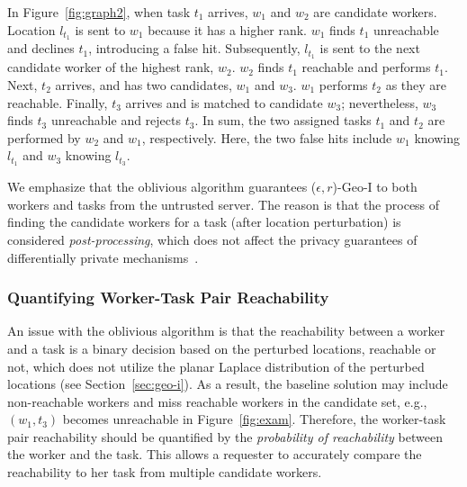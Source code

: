\documentclass{USC-Thesis}
\numberwithin{equation}{chapter}
\begin{document}
In Figure~\ref{fig:graph2}, when task $t_1$ arrives, $w_1$ and $w_2$ are candidate workers. Location $l_{t_1}$ is sent to $w_1$ because it has a higher rank. $w_1$ finds $t_1$ unreachable and declines $t_1$, introducing a false hit. Subsequently, $l_{t_1}$ is sent to the next candidate worker of the highest rank, $w_2$.  $w_2$ finds $t_1$ reachable and performs $t_1$. 
Next, $t_2$ arrives, and has two candidates, $w_1$ and $w_3$. $w_1$ performs $t_2$ as they are reachable. Finally, $t_3$ arrives and is matched to candidate $w_3$; nevertheless, $w_3$ finds $t_3$ unreachable and rejects $t_3$. In sum, the two assigned tasks $t_1$ and $t_2$ are performed by $w_2$ and $w_1$, respectively. Here, the two false hits include $w_1$ knowing $l_{t_1}$ and $w_3$ knowing $l_{t_3}$.

We emphasize that the oblivious algorithm guarantees ($\epsilon,r$)-Geo-I to both workers and tasks from the untrusted server. The reason is that the process of finding the candidate workers for a task (after location perturbation) is considered \emph{post-processing}, which does not affect the privacy guarantees of differentially private mechanisms~\cite{mcsherry2009privacy}.

\subsubsection{Quantifying Worker-Task Pair Reachability}
\label{sec:reachability}

An issue with the oblivious algorithm is that the reachability between a worker and a task is a binary decision based on the perturbed locations, reachable or not, which does not utilize the planar Laplace distribution of the perturbed locations (see Section~\ref{sec:geo-i}). As a result, the baseline solution may include non-reachable workers and miss reachable workers in the candidate set, e.g., $(w_1,t_3)$ becomes unreachable in Figure~\ref{fig:exam}. Therefore, the worker-task pair reachability should be quantified by the \emph{probability of reachability} between the worker and the task. This allows a requester to accurately compare the reachability to her task from multiple candidate workers. 
\end{document}
